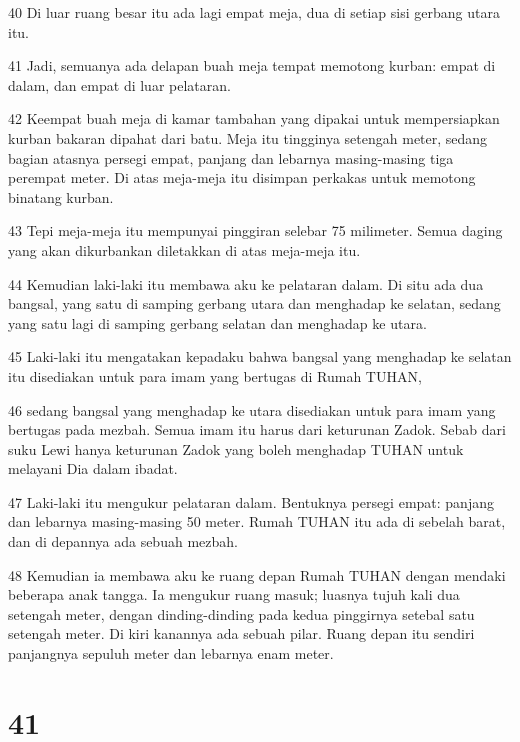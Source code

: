 \par 40 Di luar ruang besar itu ada lagi empat meja, dua di setiap sisi gerbang utara itu.
\par 41 Jadi, semuanya ada delapan buah meja tempat memotong kurban: empat di dalam, dan empat di luar pelataran.
\par 42 Keempat buah meja di kamar tambahan yang dipakai untuk mempersiapkan kurban bakaran dipahat dari batu. Meja itu tingginya setengah meter, sedang bagian atasnya persegi empat, panjang dan lebarnya masing-masing tiga perempat meter. Di atas meja-meja itu disimpan perkakas untuk memotong binatang kurban.
\par 43 Tepi meja-meja itu mempunyai pinggiran selebar 75 milimeter. Semua daging yang akan dikurbankan diletakkan di atas meja-meja itu.
\par 44 Kemudian laki-laki itu membawa aku ke pelataran dalam. Di situ ada dua bangsal, yang satu di samping gerbang utara dan menghadap ke selatan, sedang yang satu lagi di samping gerbang selatan dan menghadap ke utara.
\par 45 Laki-laki itu mengatakan kepadaku bahwa bangsal yang menghadap ke selatan itu disediakan untuk para imam yang bertugas di Rumah TUHAN,
\par 46 sedang bangsal yang menghadap ke utara disediakan untuk para imam yang bertugas pada mezbah. Semua imam itu harus dari keturunan Zadok. Sebab dari suku Lewi hanya keturunan Zadok yang boleh menghadap TUHAN untuk melayani Dia dalam ibadat.
\par 47 Laki-laki itu mengukur pelataran dalam. Bentuknya persegi empat: panjang dan lebarnya masing-masing 50 meter. Rumah TUHAN itu ada di sebelah barat, dan di depannya ada sebuah mezbah.
\par 48 Kemudian ia membawa aku ke ruang depan Rumah TUHAN dengan mendaki beberapa anak tangga. Ia mengukur ruang masuk; luasnya tujuh kali dua setengah meter, dengan dinding-dinding pada kedua pinggirnya setebal satu setengah meter. Di kiri kanannya ada sebuah pilar. Ruang depan itu sendiri panjangnya sepuluh meter dan lebarnya enam meter.

\chapter{41}

